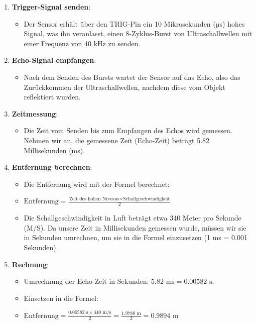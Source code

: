 \documentclass{vorlage-design-main}
\begin{document}
\begin{enumerate}
\def\labelenumi{\arabic{enumi}.}

\item
  \textbf{Trigger-Signal senden}:

  \begin{itemize}
  
  \item
    Der Sensor erhält über den TRIG-Pin ein 10 Mikrosekunden (µs) hohes
    Signal, was ihn veranlasst, einen 8-Zyklus-Burst von
    Ultraschallwellen mit einer Frequenz von 40 kHz zu senden.
  \end{itemize}
\item
  \textbf{Echo-Signal empfangen}:

  \begin{itemize}
  
  \item
    Nach dem Senden des Bursts wartet der Sensor auf das Echo, also das
    Zurückkommen der Ultraschallwellen, nachdem diese vom Objekt
    reflektiert wurden.
  \end{itemize}
\item
  \textbf{Zeitmessung}:

  \begin{itemize}
  
  \item
    Die Zeit vom Senden bis zum Empfangen des Echos wird gemessen.
    Nehmen wir an, die gemessene Zeit (Echo-Zeit) beträgt 5.82
    Millisekunden (ms).
  \end{itemize}
\item
  \textbf{Entfernung berechnen}:

  \begin{itemize}
  
  \item
    Die Entfernung wird mit der Formel berechnet:
  \item
    $\text{Entfernung} = \frac{\text{Zeit des hohen Niveaus} \times \text{Schallgeschwindigkeit}}{2}$
  \item
    Die Schallgeschwindigkeit in Luft beträgt etwa 340 Meter pro Sekunde
    (M/S). Da unsere Zeit in Millisekunden gemessen wurde, müssen wir
    sie in Sekunden umrechnen, um sie in die Formel einzusetzen (1 ms =
    0.001 Sekunden).
  \end{itemize}
\item
  \textbf{Rechnung}:

  \begin{itemize}
  
  \item
    Umrechnung der Echo-Zeit in Sekunden:
    $5.82 \text{ ms} = 0.00582 \text{ s}$.
  \item
    Einsetzen in die Formel:
  \item
    $\text{Entfernung} = \frac{0.00582 \text{ s} \times 340 \text{ m/s}}{2} = \frac{1.9788 \text{ m}}{2} = 0.9894 \text{ m}$
  \end{itemize}
\end{enumerate}
\end{document}
